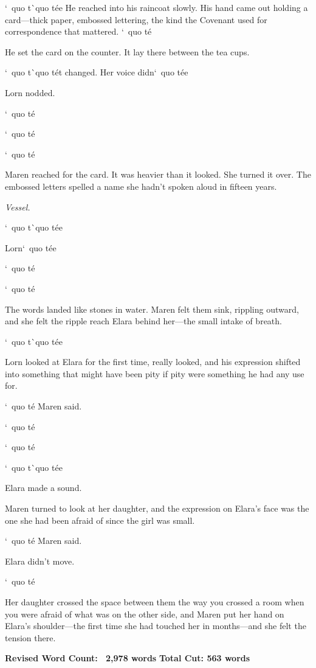 \documentclass[12pt,letterpaper,openany]{book}
\begin{document}
\par
`\ quo t\`\ quo t\'e{}e{} He reached into his raincoat slowly. His hand came out holding a card—thick paper, embossed lettering, the kind the Covenant used for correspondence that mattered. `\ quo t\'e{}
\par
He set the card on the counter. It lay there between the tea cups.
\par
`\ quo t\`\ quo t\'e{}t changed. Her voice didn`\ quo t\'e{}e{}
\par
Lorn nodded.
\par
`\ quo t\'e{}
\par
`\ quo t\'e{}
\par
`\ quo t\'e{}
\par
Maren reached for the card. It was heavier than it looked. She turned it over. The embossed letters spelled a name she hadn't spoken aloud in fifteen years.
\par
\textit{Vessel.}
\par
`\ quo t\`\ quo t\'e{}e{}
\par
Lorn`\ quo t\'e{}e{}
\par
`\ quo t\'e{}
\par
`\ quo t\'e{}
\par
The words landed like stones in water. Maren felt them sink, rippling outward, and she felt the ripple reach Elara behind her—the small intake of breath.
\par
`\ quo t\`\ quo t\'e{}e{}
\par
Lorn looked at Elara for the first time, really looked, and his expression shifted into something that might have been pity if pity were something he had any use for.
\par
`\ quo t\'e{} Maren said.
\par
`\ quo t\'e{}
\par
`\ quo t\'e{}
\par
`\ quo t\`\ quo t\'e{}e{}
\par
Elara made a sound.
\par
Maren turned to look at her daughter, and the expression on Elara's face was the one she had been afraid of since the girl was small.
\par
`\ quo t\'e{} Maren said.
\par
Elara didn't move.
\par
`\ quo t\'e{}
\par
Her daughter crossed the space between them the way you crossed a room when you were afraid of what was on the other side, and Maren put her hand on Elara's shoulder—the first time she had touched her in months—and she felt the tension there.
\par
\hrulefill\textbf{Revised Word Count: ~2,978 words} \textbf{Total Cut: 563 words}
\par
\end{document}
